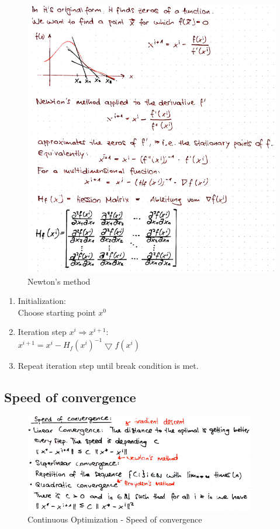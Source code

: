 \begin{figure}[H]
\centering
\includegraphics[width=1\textwidth]{figures/newtonMethod.png}
\caption{Newton’s method}
\end{figure}

\begin{enumerate}
    \item Initialization: \\
    Choose starting point $x^0$
    \item Iteration step $x^i \Rightarrow x^{i+1}$: \\
    $x^{i+1} = x^i - H_f(x^i)^{-1} \bigtriangledown f(x^i)$ 
    \item Repeat iteration step until break condition is met.
\end{enumerate}

\subsection{Speed of convergence}

\begin{figure}[H]
\centering
\includegraphics[width=0.9\textwidth]{figures/speedConvergence.png}
\caption{Continuous Optimization - Speed of convergence}
\end{figure}

